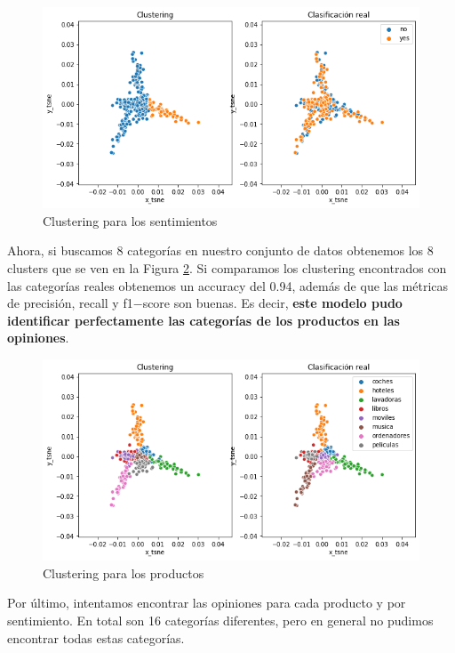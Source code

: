 \documentclass[paper=letter, fontsize=11pt]{scrartcl}
\numberwithin{equation}{section} %
\numberwithin{figure}{section} %
\numberwithin{table}{section} %
\begin{document}
\begin{figure}[H]
    \centering
    \includegraphics[scale=0.7]{figure/BOW_sentimientos_2D.png}
    \caption{Clustering para los sentimientos}
    \label{fig:BOW_sentimientos_2D}
\end{figure}
Ahora, si buscamos 8 categorías en nuestro conjunto de datos obtenemos los 8 clusters que se ven en la Figura \ref{fig:BOW_productos_2D}. Si comparamos los clustering encontrados con las categorías reales obtenemos un accuracy del 0.94, además de que las métricas de precisión, recall y f1$-$score son buenas. Es decir, \textbf{este modelo pudo identificar perfectamente las categorías de los productos en las opiniones}. 
\begin{figure}[H]
    \centering
    \includegraphics[scale=0.7]{figure/BOW_productos_2D.png}
    \caption{Clustering para los productos}
    \label{fig:BOW_productos_2D}
\end{figure}
Por último, intentamos encontrar las opiniones para cada producto y por sentimiento. En total son 16 categorías diferentes, pero en general no pudimos encontrar todas estas categorías. 
\end{document}
